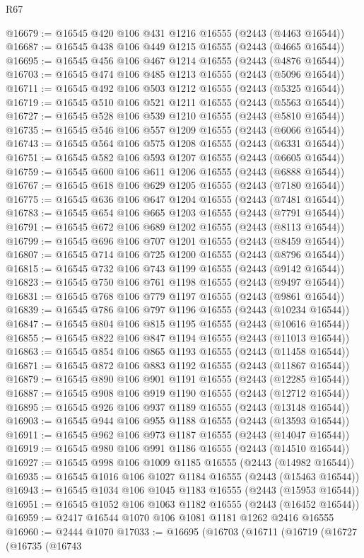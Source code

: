 \begin{lexlean}{R67}
\begin{coremodule}
@16679 := @16545 @420 @106 @431 @1216 @16555 (@2443 (@4463 @16544))
@16687 := @16545 @438 @106 @449 @1215 @16555 (@2443 (@4665 @16544))
@16695 := @16545 @456 @106 @467 @1214 @16555 (@2443 (@4876 @16544))
@16703 := @16545 @474 @106 @485 @1213 @16555 (@2443 (@5096 @16544))
@16711 := @16545 @492 @106 @503 @1212 @16555 (@2443 (@5325 @16544))
@16719 := @16545 @510 @106 @521 @1211 @16555 (@2443 (@5563 @16544))
@16727 := @16545 @528 @106 @539 @1210 @16555 (@2443 (@5810 @16544))
@16735 := @16545 @546 @106 @557 @1209 @16555 (@2443 (@6066 @16544))
@16743 := @16545 @564 @106 @575 @1208 @16555 (@2443 (@6331 @16544))
@16751 := @16545 @582 @106 @593 @1207 @16555 (@2443 (@6605 @16544))
@16759 := @16545 @600 @106 @611 @1206 @16555 (@2443 (@6888 @16544))
@16767 := @16545 @618 @106 @629 @1205 @16555 (@2443 (@7180 @16544))
@16775 := @16545 @636 @106 @647 @1204 @16555 (@2443 (@7481 @16544))
@16783 := @16545 @654 @106 @665 @1203 @16555 (@2443 (@7791 @16544))
@16791 := @16545 @672 @106 @689 @1202 @16555 (@2443 (@8113 @16544))
@16799 := @16545 @696 @106 @707 @1201 @16555 (@2443 (@8459 @16544))
@16807 := @16545 @714 @106 @725 @1200 @16555 (@2443 (@8796 @16544))
@16815 := @16545 @732 @106 @743 @1199 @16555 (@2443 (@9142 @16544))
@16823 := @16545 @750 @106 @761 @1198 @16555 (@2443 (@9497 @16544))
@16831 := @16545 @768 @106 @779 @1197 @16555 (@2443 (@9861 @16544))
@16839 := @16545 @786 @106 @797 @1196 @16555 (@2443 (@10234 @16544))
@16847 := @16545 @804 @106 @815 @1195 @16555 (@2443 (@10616 @16544))
@16855 := @16545 @822 @106 @847 @1194 @16555 (@2443 (@11013 @16544))
@16863 := @16545 @854 @106 @865 @1193 @16555 (@2443 (@11458 @16544))
@16871 := @16545 @872 @106 @883 @1192 @16555 (@2443 (@11867 @16544))
@16879 := @16545 @890 @106 @901 @1191 @16555 (@2443 (@12285 @16544))
@16887 := @16545 @908 @106 @919 @1190 @16555 (@2443 (@12712 @16544))
@16895 := @16545 @926 @106 @937 @1189 @16555 (@2443 (@13148 @16544))
@16903 := @16545 @944 @106 @955 @1188 @16555 (@2443 (@13593 @16544))
@16911 := @16545 @962 @106 @973 @1187 @16555 (@2443 (@14047 @16544))
@16919 := @16545 @980 @106 @991 @1186 @16555 (@2443 (@14510 @16544))
@16927 := @16545 @998 @106 @1009 @1185 @16555 (@2443 (@14982 @16544))
@16935 := @16545 @1016 @106 @1027 @1184 @16555 (@2443 (@15463 @16544))
@16943 := @16545 @1034 @106 @1045 @1183 @16555 (@2443 (@15953 @16544))
@16951 := @16545 @1052 @106 @1063 @1182 @16555 (@2443 (@16452 @16544))
@16959 := @2417 @16544 @1070 @106 @1081 @1181 @1262 @2416 @16555
@16960 := @2444 @1070
@17033 := @16695
    (@16703
      (@16711
        (@16719
          (@16727
            (@16735
              (@16743

\end{coremodule}
\end{lexlean}
